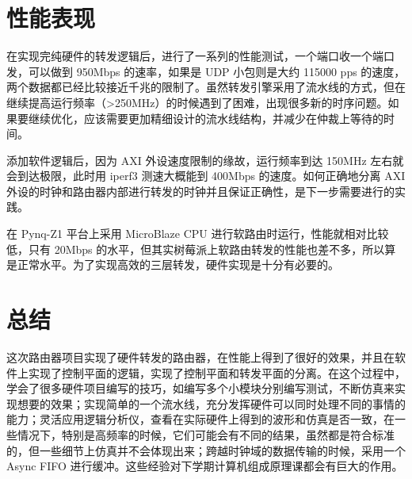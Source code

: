 \documentclass{ctexart}
\begin{document}
\section{性能表现}
  在实现完纯硬件的转发逻辑后，进行了一系列的性能测试，一个端口收一个端口发，可以做到 950Mbps 的速率，如果是 UDP 小包则是大约 115000 pps 的速度，两个数据都已经比较接近千兆的限制了。虽然转发引擎采用了流水线的方式，但在继续提高运行频率（>250MHz）的时候遇到了困难，出现很多新的时序问题。如果要继续优化，应该需要更加精细设计的流水线结构，并减少在仲裁上等待的时间。

  添加软件逻辑后，因为 AXI 外设速度限制的缘故，运行频率到达 150MHz 左右就会到达极限，此时用 iperf3 测速大概能到 400Mbps 的速度。如何正确地分离 AXI 外设的时钟和路由器内部进行转发的时钟并且保证正确性，是下一步需要进行的实践。

  在 Pynq-Z1 平台上采用 MicroBlaze CPU 进行软路由时运行，性能就相对比较低，只有 20Mbps 的水平，但其实树莓派上软路由转发的性能也差不多，所以算是正常水平。为了实现高效的三层转发，硬件实现是十分有必要的。

\section{总结}
  这次路由器项目实现了硬件转发的路由器，在性能上得到了很好的效果，并且在软件上实现了控制平面的逻辑，实现了控制平面和转发平面的分离。在这个过程中，学会了很多硬件项目编写的技巧，如编写多个小模块分别编写测试，不断仿真来实现想要的效果；实现简单的一个流水线，充分发挥硬件可以同时处理不同的事情的能力；灵活应用逻辑分析仪，查看在实际硬件上得到的波形和仿真是否一致，在一些情况下，特别是高频率的时候，它们可能会有不同的结果，虽然都是符合标准的，但一些细节上仿真并不会体现出来；跨越时钟域的数据传输的时候，采用一个 Async FIFO 进行缓冲。这些经验对下学期计算机组成原理课都会有巨大的作用。
\end{document}
